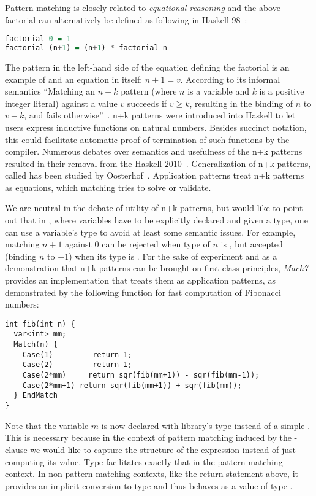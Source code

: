 Pattern matching is closely related to \emph{equational reasoning} and the above 
factorial can alternatively be defined as following in Haskell 98~\cite{Haskell98Book}:
%
\begin{lstlisting}[language=Haskell]
factorial 0 = 1
factorial (n+1) = (n+1) * factorial n
\end{lstlisting}
%
\noindent
The  pattern in the left-hand side of the equation defining 
the factorial is an example of  and an equation in itself: 
$n+1=v$. According to its informal semantics ``Matching an $n+k$ pattern (where 
$n$ is a variable and $k$ is a positive integer literal) against a value $v$ 
succeeds if $v \ge k$, resulting in the binding of $n$ to $v-k$, and fails 
otherwise''~\cite{haskell98}. n+k patterns were introduced into Haskell to let 
users express inductive functions on natural numbers. Besides succinct notation, 
this could facilitate automatic proof of termination of such functions by the 
compiler. Numerous debates over semantics and usefulness of the n+k patterns 
resulted in their removal from the Haskell 2010~\cite{haskell2010}. 
Generalization of n+k patterns, called  has been 
studied by Oosterhof~\cite{OosterhofThesis}. Application patterns treat n+k 
patterns as equations, which matching tries to solve or validate.

We are neutral in the debate of utility of n+k patterns, but would like to point 
out that in \Cpp{}, where variables have to be explicitly declared and given a 
type, one can use a variable's type to avoid at least some semantic issues. For 
example, matching $n+1$ against 0 can be rejected when type of $n$ is 
, but accepted (binding $n$ to $-1$) when its type is 
. For the sake of experiment and as a demonstration that n+k patterns 
can be brought on first class principles, \emph{Mach7} provides an 
implementation that treats them as application patterns, as demonstrated by the 
following function for fast computation of Fibonacci numbers:

\begin{lstlisting}[keepspaces]
int fib(int n) {
  var<int> mm;
  Match(n) {
    Case(1)         return 1;     
    Case(2)         return 1;
    Case(2*mm)     return sqr(fib(mm+1)) - sqr(fib(mm-1));
    Case(2*mm+1) return sqr(fib(mm+1)) + sqr(fib(mm));
  } EndMatch
}
\end{lstlisting}

\noindent
Note that the variable $m$ is now declared with library's type  
instead of a simple . This is necessary because in the context of 
pattern matching induced by the -clause we would like to capture the 
structure of the expression  instead of just computing its value. 
Type  facilitates exactly that in the pattern-matching context. In 
non-pattern-matching contexts, like the return statement above, it provides an 
implicit conversion to type  and thus behaves as a value of type . 

